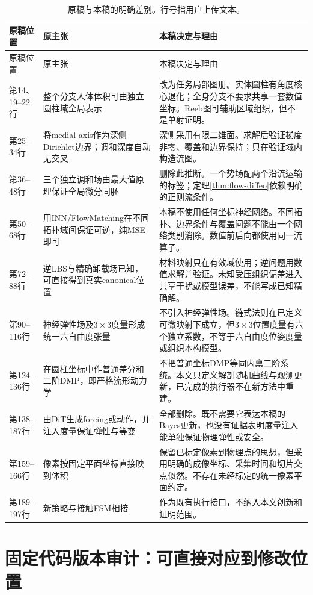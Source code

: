 \documentclass[UTF8,11pt,a4paper,fontset=fandol]{ctexart}
\numberwithin{equation}{section}
\theoremstyle{plain}
\theoremstyle{definition}
\theoremstyle{remark}
\begin{document}
\small
\begin{longtable}{P{27mm}P{48mm}P{71mm}}
\caption{原稿与本稿的明确差别。行号指用户上传文本。}\label{tab:draft-audit}\\
\toprule 原稿位置 & 原主张 & 本稿决定与理由\\\midrule\endfirsthead
\toprule 原稿位置 & 原主张 & 本稿决定与理由\\\midrule\endhead
\bottomrule\endfoot
第14、19--22行 & 整个分支人体体积可由独立圆柱域全局表示 & 改为任务局部图册。实体圆柱有角度核心退化；全身分支不要求共享一套数值坐标。Reeb图可辅助区域组织，但不是单射证明。\\
第25--34行 & 将medial axis作为深侧Dirichlet边界；调和深度自动无交叉 & 深侧采用有限二维面。求解后验证梯度非零、覆盖和边界保持；只在验证域内构造流图。\\
第36--48行 & 三个独立调和场由最大值原理保证全局微分同胚 & 删除此推断。一个势场配两个沿流运输的标签；定理\ref{thm:flow-diffeo}依赖明确的正则流条件。\\
第50--68行 & 用INN/FlowMatching在不同拓扑域间保证可逆，纯MSE即可 & 本稿不使用任何坐标神经网络。不同拓扑、边界条件与覆盖问题不能由一个网络类别消除。数值前后向都使用同一流算子。\\
第72--88行 & 逆LBS与精确卸载场已知，可直接得到真实canonical位置 & 材料映射只在有效域使用；逆问题用数值求解并验证。未知受压组织偏差进入共享干扰或模型误差，不能写成已知精确解。\\
第90--116行 & 神经弹性场及$3\times3$度量形成统一六自由度张量 & 不引入神经弹性场。链式法则在已定义可微映射下成立，但$3\times3$位置度量有六个独立系数，不等于六自由度位姿度量或组织本构模型。\\
第124--136行 & 在圆柱坐标中作普通差分和二阶DMP，即严格流形动力学 & 不把普通坐标DMP等同内禀二阶系统。本文只定义解剖随机曲线与观测更新，已完成的执行器不在新方法中重建。\\
第138--187行 & 由DiT生成forcing或动作，并注入度量保证弹性与等变 & 全部删除。既不需要它表达本稿的Bayes更新，也没有证据表明度量注入能单独保证物理弹性或安全。\\
第159--166行 & 像素按固定平面坐标直接映到体积 & 保留已标定像素到物理点的思想，但采用明确的成像坐标、采集时间和切片交点似然。不存在未经标定的统一像素平面约定。\\
第189--197行 & 新策略与接触FSM相接 & 作为既有执行接口，不纳入本文创新和证明范围。\\
\end{longtable}
\normalsize

\section{固定代码版本审计：可直接对应到修改位置}\label{app:code}
\end{document}
